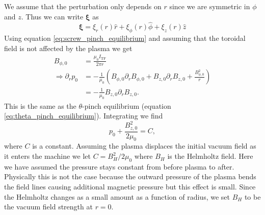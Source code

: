 We assume that the perturbation only depends on $r$ since we are symmetric in $\phi$ and $z$. Thus we can write $\bm{\xi}$ as
\begin{equation*}
  \bm{\xi} = \xi_r(r) \hat{r} + \xi_\phi(r) \hat{\phi} + \xi_z(r) \hat{z} \label{eq:xi_vector}
\end{equation*}
Using equation \ref{eq:screw_pinch_equilibrium} and assuming that the toroidal field is not affected by the plasma we get
\begin{align}
  B_{\phi, 0} &= \frac{\mu_0 I_\mathrm{TF}}{2 \pi r} \label{eq:toroidal_field} \\
  \Rightarrow \partial_r p_0 &= -\frac{1}{\mu_0} \left( B_{\phi, 0} \partial_r B_{\phi, 0} + B_{z, 0} \partial_r B_{z, 0} + \frac{B_{\phi, 0}^2}{r} \right) \\
  &= -\frac{1}{\mu_0} B_{z, 0} \partial_r B_{z, 0} \label{eq:simple_screw_pinch_pressure_gradient}.
\end{align}
This is the same as the $\theta$-pinch equilibrium (equation \ref{eq:theta_pinch_equilibrium}). Integrating we find
\begin{equation}
  p_0 + \frac{B_{z, 0}^2}{2 \mu_0} = C \label{eq:screw_pinch_equilibrium_integrated},
\end{equation}
where $C$ is a constant. Assuming the plasma displaces the initial vacuum field as it enters the machine we let $C = B_H^2 / 2 \mu_0$ where $B_H$ is the Helmholtz field. Here we have assumed the pressure stays constant from before plasma to after. Physically this is not the case because the outward pressure of the plasma bends the field lines causing additional magnetic pressure but this effect is small. Since the Helmholtz changes as a small amount as a function of radius, we set $B_H$ to be the vacuum field strength at $r = 0$.

